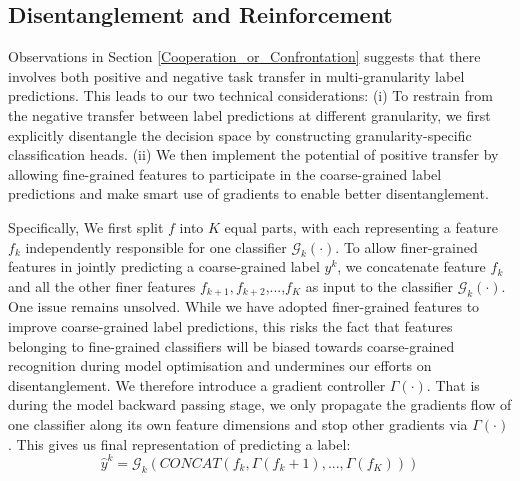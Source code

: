 \documentclass[final]{cvpr}
\begin{document}
\subsection{Disentanglement and Reinforcement}


Observations in Section \ref{Cooperation_or_Confrontation}  suggests that there involves both positive and negative task transfer in multi-granularity label predictions. This leads to our two technical considerations: (i) To restrain from the negative transfer between label predictions at different granularity,  we first explicitly disentangle the decision space by constructing granularity-specific classification heads. (ii) We then implement the potential of positive transfer by allowing fine-grained features to participate in the coarse-grained label predictions and make smart use of gradients to enable better disentanglement.

Specifically, We first split $f$ into $K$ equal parts, with each representing a feature $f_k$ independently responsible for one classifier $\mathcal{G}_k(\cdot)$. To allow finer-grained features in jointly predicting a coarse-grained label $y^k$, we concatenate feature $f_k$ and all the other finer features $f_{k+1},f_{k+2}$,...,${f_K}$ as input to the classifier $\mathcal{G}_k(\cdot)$. One issue remains unsolved. While we have adopted finer-grained features to improve coarse-grained label predictions, this risks the fact that features belonging to fine-grained classifiers will be biased towards coarse-grained recognition during model optimisation and undermines our efforts on disentanglement. We therefore introduce a gradient controller $\Gamma(\cdot)$. That is during the model backward passing stage, we only propagate the gradients flow of one classifier along its own feature dimensions and stop other gradients via $\Gamma(\cdot)$. This gives us final representation of predicting a label:
\begin{equation}
\hat{y}^k = \mathcal{G}_k(CONCAT(f_k, \Gamma(f_k+1), ..., \Gamma(f_K)))
\end{equation}
\end{document}
